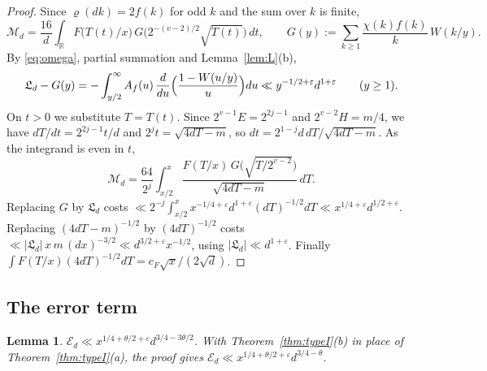 \documentclass[11pt]{amsart}
\newtheorem{lemma}[theorem]{Lemma}
\theoremstyle{remark}
\theoremstyle{definition}
\numberwithin{equation}{section}
\newcommand{\R}{\mathbb{R}}
\newcommand{\eps}{\varepsilon}
\newcommand{\Lf}{\mathfrak{L}}
\begin{document}
\begin{proof}
Since $\varrho(dk)=2f(k)$ for odd $k$ and the sum over $k$ is finite,
\[
\mathcal M_d=\frac{16}{d}\int_\R F\bigl(T(t)/x\bigr)\,G\bigl(2^{-(v-2)/2}\sqrt{T(t)}\bigr)\,dt,\qquad G(y):=\sum_{k\ge1}\frac{\chi(k)f(k)}k\,W(k/y).
\]
By \eqref{eq:omega}, partial summation and Lemma~\ref{lem:L}(b),
\[
\Lf_d-G(y)=-\int_{y/2}^\infty A_f(u)\,\frac{d}{du}\Bigl(\frac{1-W(u/y)}u\Bigr)du\ll y^{-1/2+\eps}d^{1+\eps}\qquad(y\ge1).
\]
On $t>0$ we substitute $T=T(t)$. Since $2^{v-1}E=2^{2j-1}$ and $2^{v-2}H=m/4$, we have $dT/dt=2^{2j-1}t/d$ and $2^{j}t=\sqrt{4dT-m}$, so $dt=2^{1-j}d\,dT/\sqrt{4dT-m}$. As the integrand is even in $t$,
\[
\mathcal M_d=\frac{64}{2^j}\int_{x/2}^x\frac{F(T/x)\,G\bigl(\sqrt{T/2^{v-2}}\bigr)}{\sqrt{4dT-m}}\,dT .
\]
Replacing $G$ by $\Lf_d$ costs $\ll2^{-j}\int_{x/2}^xx^{-1/4+\eps}d^{1+\eps}(dT)^{-1/2}dT\ll x^{1/4+\eps}d^{1/2+\eps}$. Replacing $(4dT-m)^{-1/2}$ by $(4dT)^{-1/2}$ costs $\ll|\Lf_d|\,x\,m\,(dx)^{-3/2}\ll d^{3/2+\eps}x^{-1/2}$, using $|\Lf_d|\ll d^{1+\eps}$. Finally $\int F(T/x)(4dT)^{-1/2}dT=c_F\sqrt x/(2\sqrt d)$.
\end{proof}

\subsection{The error term}

\begin{lemma}\label{lem:error}
$\mathcal E_d\ll x^{1/4+\theta/2+\eps}d^{3/4-3\theta/2}$. With Theorem~\ref{thm:typeI}(b) in place of Theorem~\ref{thm:typeI}(a), the proof gives $\mathcal E_d\ll x^{1/4+\theta/2+\eps}d^{3/4-\theta}$.
\end{lemma}
\end{document}
